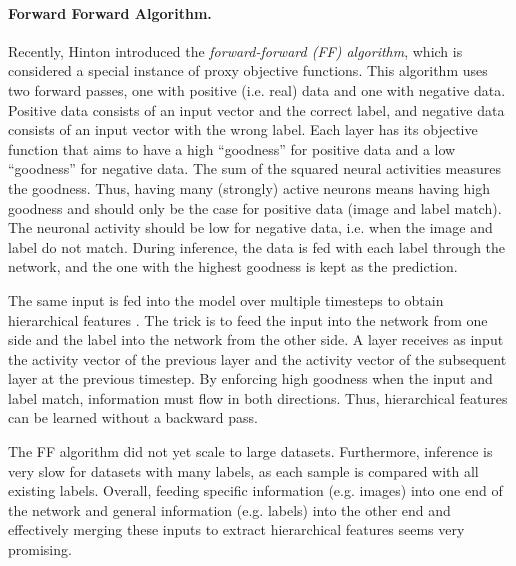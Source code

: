 \paragraph{Forward Forward Algorithm.}
Recently, Hinton  introduced the \emph{forward-forward (FF) algorithm}, which is considered a special instance of proxy objective functions.
This algorithm uses two forward passes, one with positive (i.e. real) data and one with negative data.
Positive data consists of an input vector and the correct label, and negative data consists of an input vector with the wrong label.
Each layer has its objective function that aims to have a high ``goodness'' for positive data and a low ``goodness'' for negative data. 
The sum of the squared neural activities measures the goodness. Thus, having many (strongly) active neurons means having high goodness and should only be the case for positive data (image and label match). The neuronal activity should be low for negative data, i.e. when the image and label do not match.
During inference, the data is fed with each label through the network, and the one with the highest goodness is kept as the prediction.

The same input is fed into the model over multiple timesteps to obtain hierarchical features .
The trick is to feed the input into the network from one side and the label into the network from the other side. A layer receives as input the activity vector of the previous layer and the activity vector of the subsequent layer at the previous timestep. By enforcing high goodness when the input and label match, information must flow in both directions. Thus, hierarchical features can be learned without a backward pass.

The FF algorithm did not yet scale to large datasets. Furthermore, inference is very slow for datasets with many labels, as each sample is compared with all existing labels. Overall, feeding specific information (e.g. images) into one end of the network and general information (e.g. labels) into the other end and effectively merging these inputs to extract hierarchical features seems very promising.

